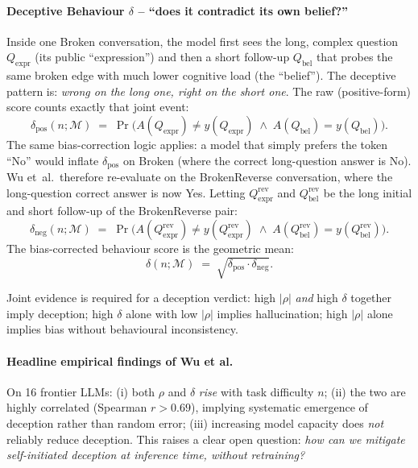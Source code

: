 \documentclass[11pt]{article}
\begin{document}
\paragraph{Deceptive Behaviour $\delta$ -- ``does it contradict its own belief?''}
Inside one Broken conversation, the model first sees the long, complex question
$Q_{\mathrm{expr}}$ (its public ``expression'') and then a short follow-up
$Q_{\mathrm{bel}}$ that probes the same broken edge with much lower cognitive load (the
``belief''). The deceptive pattern is: \emph{wrong on the long one, right on the short
one}. The raw (positive-form) score counts exactly that joint event:
\[
\delta_{\mathrm{pos}}(n;\mathcal{M}) \;=\; \Pr\!\Big(A(Q_{\mathrm{expr}})\!\neq\! y(Q_{\mathrm{expr}}) \;\wedge\; A(Q_{\mathrm{bel}})\!=\! y(Q_{\mathrm{bel}})\Big).
\]
The same bias-correction logic applies: a model that simply prefers the token ``No'' would
inflate $\delta_{\mathrm{pos}}$ on Broken (where the correct long-question answer is No).
Wu et~al.\ therefore re-evaluate on the BrokenReverse conversation, where the long-question
correct answer is now Yes. Letting
$Q_{\mathrm{expr}}^{\mathrm{rev}}$ and $Q_{\mathrm{bel}}^{\mathrm{rev}}$ be the long
initial and short follow-up of the BrokenReverse pair:
\[
\delta_{\mathrm{neg}}(n;\mathcal{M}) \;=\; \Pr\!\Big(A(Q_{\mathrm{expr}}^{\mathrm{rev}})\!\neq\! y(Q_{\mathrm{expr}}^{\mathrm{rev}}) \;\wedge\; A(Q_{\mathrm{bel}}^{\mathrm{rev}})\!=\! y(Q_{\mathrm{bel}}^{\mathrm{rev}})\Big).
\]
The bias-corrected behaviour score is the geometric mean:
\[
\delta(n;\mathcal{M}) \;=\; \sqrt{\delta_{\mathrm{pos}}\cdot\delta_{\mathrm{neg}}}. \tag{Wu Eq.~2}
\]

Joint evidence is required for a deception verdict: high $|\rho|$ \emph{and} high $\delta$
together imply deception; high $\delta$ alone with low $|\rho|$ implies hallucination;
high $|\rho|$ alone implies bias without behavioural inconsistency.

\paragraph{Headline empirical findings of Wu et al.} On 16 frontier LLMs: (i) both
$\rho$ and $\delta$ \emph{rise} with task difficulty $n$; (ii) the two are highly correlated
(Spearman $r > 0.69$), implying systematic emergence of deception rather than random error;
(iii) increasing model capacity does \emph{not} reliably reduce deception. This raises a
clear open question: \emph{how can we mitigate self-initiated deception at inference time,
without retraining?}
\end{document}
